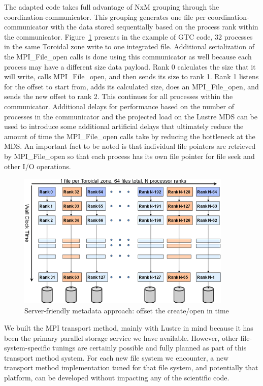 The adapted code takes full advantage of NxM grouping through the coordination-communicator. 
This grouping generates one file per coordination-communicator with the data stored 
sequentially based on the process rank within the communicator.  Figure~\ref{fig:serialized-open} presents 
in the example of GTC code, 32 processes in the same Toroidal zone write to one 
integrated file. Additional serialization of the MPI\_File\_open calls is done 
using this communicator as well because each process may have a different size 
data payload. Rank 0 calculates the size that it will write, calls MPI\_File\_open, 
and then sends its size to rank 1. Rank 1 listens for the offset to start from, 
adds its calculated size, does an MPI\_File\_open, and sends the new offset to 
rank 2. This continues for all processes within the communicator. Additional delays 
for performance based on the number of processes in the communicator and the projected 
load on the Lustre MDS can be used to introduce some additional artificial delays 
that ultimately reduce the amount of time the MPI\_File\_open calls take by reducing 
the bottleneck at the MDS. An important fact to be noted is that individual file 
pointers are retrieved by MPI\_File\_open so that each process has its own file 
pointer for file seek and other I/O operations.

\begin{figure}[htbp]
\begin{center}
\includegraphics[width=290pt, height=185pt]{figures/mpi-method-serialized-opens.png}
\caption{Server-friendly metadata approach: offset the create/open in time}
\label{fig:serialized-open}
\end{center}
\end{figure}

We built the MPI transport method, mainly with Lustre in mind because it has been 
the primary parallel storage service we have available. However, other file-system-specific 
tunings are certainly possible and fully planned as part of this transport method 
system. For each new file system we encounter, a new transport method implementation 
tuned for that file system, and potentially that platform, can be developed without 
impacting any of the scientific code.


